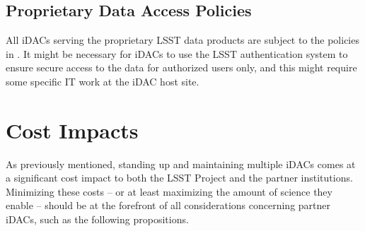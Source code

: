 \subsection{Proprietary Data Access Policies}
All iDACs serving the proprietary LSST data products are subject to the policies in . It might be necessary for iDACs to use the LSST authentication system to ensure secure access to the data for authorized users only, and this might require some specific IT work at the iDAC host site. 




\section{Cost Impacts}\label{sec:costs}

As previously mentioned, standing up and maintaining multiple iDACs comes at a significant cost impact to both the LSST Project and the partner institutions. Minimizing these costs -- or at least maximizing the amount of science they enable -- should be at the forefront of all considerations concerning partner iDACs, such as the following propositions.

